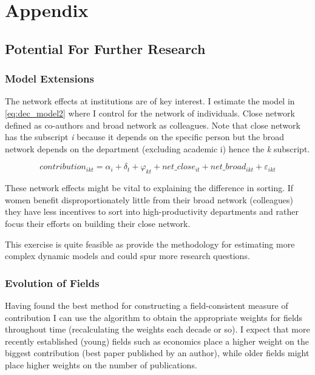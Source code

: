 \documentclass[10pt]{report}
\begin{document}
\printbibliography

\newpage
\section*{Appendix}
\label{sec:appendix}

\subsection*{Potential For Further Research}
\label{sec:potential}

\subsubsection*{Model Extensions}

The network effects at institutions are of key interest. I estimate the model in \autoref{eq:dec_model2} where I control for the network of individuals. Close network defined as co-authors and broad network as colleagues. Note that close network has the subscript \textit{i} because it depends on the specific person but the broad network depends on the department (excluding academic i) hence the \textit{k} subscript.

\begin{equation}
    \label{eq:dec_model2}
    contribution_{ikt} = \alpha_i + \delta_t + \varphi_{kt} + net\_close_{it} + net\_broad_{ikt} + \varepsilon_{ikt}
\end{equation}

These network effects might be vital to explaining the difference in sorting. If women benefit disproportionately little from their broad network (colleagues) they have less incentives to sort into high-productivity departments and rather focus their efforts on building their close network. 

This exercise is quite feasible as \textcite{Bonhomme2019} provide the methodology for estimating more complex dynamic models and could spur more research questions.


\subsubsection*{Evolution of Fields}
\label{ssec:evfield}
Having found the best method for constructing a field-consistent measure of contribution I can use the algorithm to obtain the appropriate weights for fields throughout time (recalculating the weights each decade or so). I expect that more recently established (young) fields such as economics place a higher weight on the biggest contribution (best paper published by an author), while older fields might place higher weights on the number of publications.
\end{document}

